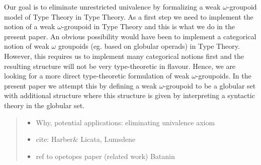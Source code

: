 Our goal is to eliminate unrestricted univalence by formalizing a weak
$\omega$-groupoid model of Type Theory in Type Theory.  As a first
step we need to implement the notion of a weak $\omega$-groupoid in
Type Theory and this is what we do in the present paper.  An obvious
possibility would have been to implement a categorical notion of weak
$\omega$ groupoids (eg. based on globular operads) in Type
Theory. However, this requires us to implement many categorical
notions first and the resulting structure will not be very
type-theoretic in flavour. Hence, we are looking for a more direct
type-theoretic formulation of weak $\omega$-groupoids. In the present
paper we attempt this by defining a weak $\omega$-groupoid to be a
globular set with additional structure where this structure is given
by interpreting a syntactic theory in the globular set.



\begin{quote}
  \begin{itemize}
  \item 
    Why, potential applications: eliminating univalence axiom
  \item cite: Harber\& Licata, Lumsdene
  \item ref to opetopes paper (related work) Batanin
  \end{itemize}
\end{quote}

